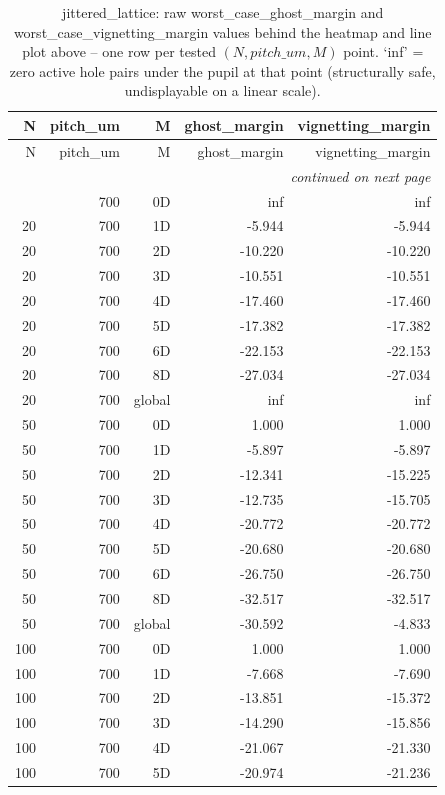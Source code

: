 \begin{longtable}{rrrrr}
\caption{jittered\_lattice: raw worst\_case\_ghost\_margin and worst\_case\_vignetting\_margin values behind the heatmap and line plot above -- one row per tested $(N, pitch\_um, M)$ point. `inf' = zero active hole pairs under the pupil at that point (structurally safe, undisplayable on a linear scale).} \\
\toprule
N & pitch\_um & M & ghost\_margin & vignetting\_margin \\
\midrule
\endfirsthead
\toprule
N & pitch\_um & M & ghost\_margin & vignetting\_margin \\
\midrule
\endhead
\midrule
\multicolumn{5}{r}{\itshape continued on next page} \\
\endfoot
\bottomrule
\endlastfoot
20 & 700 & 0D & inf & inf \\
20 & 700 & 1D & -5.944 & -5.944 \\
20 & 700 & 2D & -10.220 & -10.220 \\
20 & 700 & 3D & -10.551 & -10.551 \\
20 & 700 & 4D & -17.460 & -17.460 \\
20 & 700 & 5D & -17.382 & -17.382 \\
20 & 700 & 6D & -22.153 & -22.153 \\
20 & 700 & 8D & -27.034 & -27.034 \\
20 & 700 & global & inf & inf \\
50 & 700 & 0D & 1.000 & 1.000 \\
50 & 700 & 1D & -5.897 & -5.897 \\
50 & 700 & 2D & -12.341 & -15.225 \\
50 & 700 & 3D & -12.735 & -15.705 \\
50 & 700 & 4D & -20.772 & -20.772 \\
50 & 700 & 5D & -20.680 & -20.680 \\
50 & 700 & 6D & -26.750 & -26.750 \\
50 & 700 & 8D & -32.517 & -32.517 \\
50 & 700 & global & -30.592 & -4.833 \\
100 & 700 & 0D & 1.000 & 1.000 \\
100 & 700 & 1D & -7.668 & -7.690 \\
100 & 700 & 2D & -13.851 & -15.372 \\
100 & 700 & 3D & -14.290 & -15.856 \\
100 & 700 & 4D & -21.067 & -21.330 \\
100 & 700 & 5D & -20.974 & -21.236 \\

\end{longtable}
